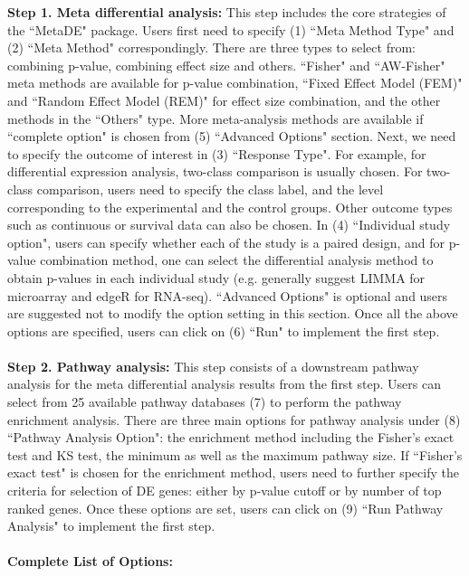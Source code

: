 \textbf{Step 1. Meta differential analysis:} This step includes the core strategies of the ``MetaDE" package. Users first need to specify (1) ``Meta Method Type" and (2) ``Meta Method" correspondingly. There are three types to select from: combining p-value, combining effect size and others. ``Fisher" and ``AW-Fisher" meta methods are available for p-value combination, ``Fixed Effect Model (FEM)" and ``Random Effect Model (REM)" for effect size combination, and the other methods in the ``Others" type. More meta-analysis methods are available if ``complete option" is chosen from (5) ``Advanced Options" section. Next, we need to specify the outcome of interest in (3) ``Response Type". For example, for differential expression analysis, two-class comparison is usually chosen. For two-class comparison, users need to specify the class label, and the level corresponding to the experimental and the control groups. Other outcome types such as continuous or survival data can also be chosen. In (4) ``Individual study option", users can specify whether each of the study is a paired design, and for p-value combination method, one can select the differential analysis method to obtain p-values in each individual study (e.g. generally suggest LIMMA for microarray and edgeR for RNA-seq). ``Advanced Options" is optional and users are suggested not to modify the option setting in this section. Once all the above options are specified, users can click on (6) ``Run" to implement the first step. \\~\\

\textbf{Step 2. Pathway analysis:} This step consists of a downstream pathway analysis for the meta differential analysis results from the first step. Users can select from 25 available pathway databases (7) to perform the pathway enrichment analysis. There are three main options for pathway analysis under (8) ``Pathway Analysis Option": the enrichment method including the Fisher's exact test and KS test, the minimum as well as the maximum pathway size. If ``Fisher's exact test" is chosen for the enrichment method, users need to further specify the criteria for selection of DE genes: either by p-value cutoff or by number of top ranked genes. Once these options are set, users can click on (9) ``Run Pathway Analysis" to implement the first step. \\~\\


\textbf{Complete List of Options:} 

